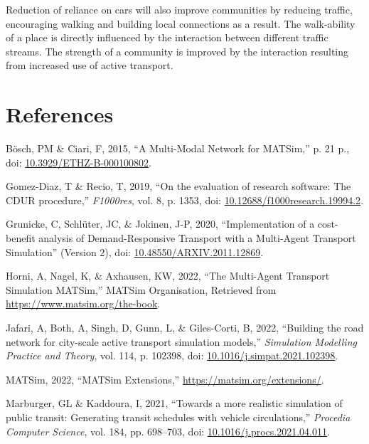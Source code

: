 \documentclass[11pt]{article}
\begin{document}
Reduction of reliance on cars will also improve communities by reducing traffic, encouraging walking and building local connections as a result. The walk-ability of a place is directly influenced by the interaction between different traffic streams. The strength of a community is improved by the interaction resulting from increased use of active transport.
\section{References}
\label{sec:orgb3be19c}
\begin{hangparas}{1.5em}{1}
\hypertarget{citeproc_bib_item_1}{Bösch, PM \& Ciari, F, 2015, “A Multi-Modal Network for MATSim,” p. 21 p., doi: \href{https://doi.org/10.3929/ETHZ-B-000100802}{10.3929/ETHZ-B-000100802}.}

\hypertarget{citeproc_bib_item_2}{Gomez-Diaz, T \& Recio, T, 2019, “On the evaluation of research software: The CDUR procedure,” \textit{F1000res}, vol. 8, p. 1353, doi: \href{https://doi.org/10.12688/f1000research.19994.2}{10.12688/f1000research.19994.2}.}

\hypertarget{citeproc_bib_item_3}{Grunicke, C, Schlüter, JC, \& Jokinen, J-P, 2020, “Implementation of a cost-benefit analysis of Demand-Responsive Transport with a Multi-Agent Transport Simulation” (Version 2), doi: \href{https://doi.org/10.48550/ARXIV.2011.12869}{10.48550/ARXIV.2011.12869}.}

\hypertarget{citeproc_bib_item_4}{Horni, A, Nagel, K, \& Axhausen, KW, 2022, “The Multi-Agent Transport Simulation MATSim,” MATSim Organisation, Retrieved from \url{https://www.matsim.org/the-book}.}

\hypertarget{citeproc_bib_item_5}{Jafari, A, Both, A, Singh, D, Gunn, L, \& Giles-Corti, B, 2022, “Building the road network for city-scale active transport simulation models,” \textit{Simulation Modelling Practice and Theory}, vol. 114, p. 102398, doi: \href{https://doi.org/10.1016/j.simpat.2021.102398}{10.1016/j.simpat.2021.102398}.}

\hypertarget{citeproc_bib_item_6}{MATSim, 2022, “MATSim Extensions,” \url{https://matsim.org/extensions/}.}

\hypertarget{citeproc_bib_item_7}{Marburger, GL \& Kaddoura, I, 2021, “Towards a more realistic simulation of public transit: Generating transit schedules with vehicle circulations,” \textit{Procedia Computer Science}, vol. 184, pp. 698–703, doi: \href{https://doi.org/10.1016/j.procs.2021.04.011}{10.1016/j.procs.2021.04.011}.}


\end{hangparas}
\end{document}
